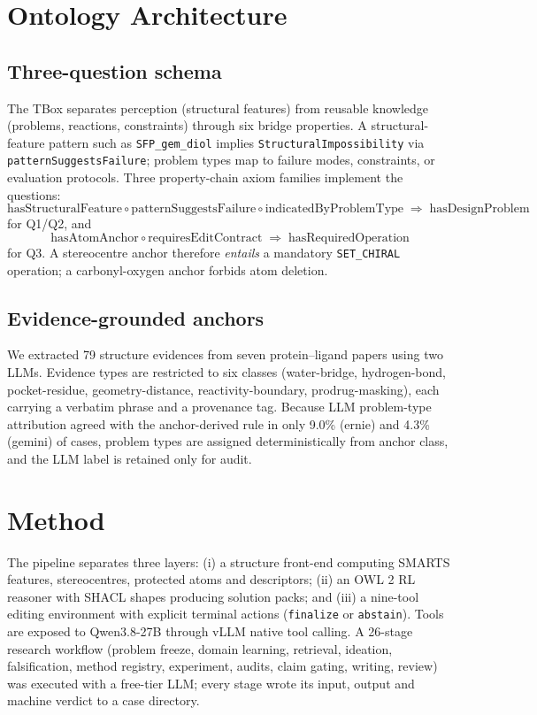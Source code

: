 \documentclass[11pt,a4paper]{article}
\begin{document}
\section{Ontology Architecture}
\subsection{Three-question schema}
The TBox separates perception (structural features) from reusable knowledge (problems, reactions, constraints) through six bridge properties. A structural-feature pattern such as \texttt{SFP\_gem\_diol} implies \texttt{StructuralImpossibility} via \texttt{patternSuggestsFailure}; problem types map to failure modes, constraints, or evaluation protocols. Three property-chain axiom families implement the questions:
\[
\text{hasStructuralFeature}\circ\text{patternSuggestsFailure}\circ\text{indicatedByProblemType}
\;\Rightarrow\; \text{hasDesignProblem}
\]
for Q1/Q2, and
\[
\text{hasAtomAnchor}\circ\text{requiresEditContract}
\;\Rightarrow\; \text{hasRequiredOperation}
\]
for Q3. A stereocentre anchor therefore \emph{entails} a mandatory \texttt{SET\_CHIRAL} operation; a carbonyl-oxygen anchor forbids atom deletion.

\subsection{Evidence-grounded anchors}
We extracted 79 structure evidences from seven protein--ligand papers using two LLMs. Evidence types are restricted to six classes (water-bridge, hydrogen-bond, pocket-residue, geometry-distance, reactivity-boundary, prodrug-masking), each carrying a verbatim phrase and a provenance tag. Because LLM problem-type attribution agreed with the anchor-derived rule in only 9.0\% (ernie) and 4.3\% (gemini) of cases, problem types are assigned deterministically from anchor class, and the LLM label is retained only for audit.

\section{Method}
The pipeline separates three layers: (i) a structure front-end computing SMARTS features, stereocentres, protected atoms and descriptors; (ii) an OWL 2 RL reasoner with SHACL shapes producing solution packs; and (iii) a nine-tool editing environment with explicit terminal actions (\texttt{finalize} or \texttt{abstain}). Tools are exposed to Qwen3.8-27B through vLLM native tool calling. A 26-stage research workflow (problem freeze, domain learning, retrieval, ideation, falsification, method registry, experiment, audits, claim gating, writing, review) was executed with a free-tier LLM; every stage wrote its input, output and machine verdict to a case directory.
\end{document}

